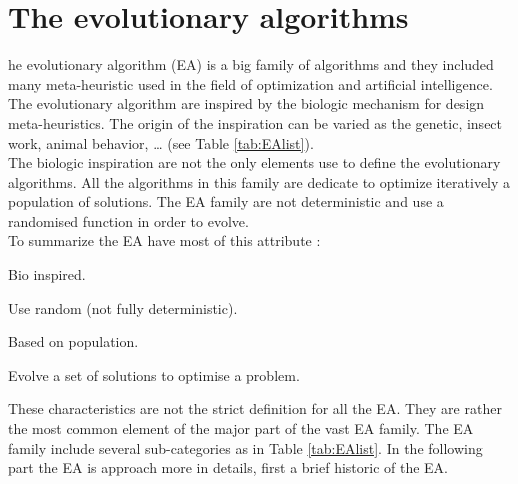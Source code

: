 \section{The evolutionary algorithms }
he evolutionary algorithm (EA) is a big family of algorithms and they included many meta-heuristic used in the field of optimization and artificial intelligence.\\
 The evolutionary algorithm are inspired by the biologic mechanism for design meta-heuristics. The origin of the inspiration can be varied as  the genetic, insect work, animal behavior, … (see Table  \ref{tab:EAlist}). \\
 The biologic inspiration are not the only elements use to define the evolutionary algorithms. All the algorithms in this family are dedicate to optimize iteratively a population of solutions. 
 The EA family are not deterministic and use a randomised function in order to evolve. \\
 To summarize the EA have most of this attribute : 
\begin{description}
\item Bio inspired. 
\item Use random (not fully deterministic).
\item Based on population. 
\item Evolve a set of solutions to optimise a problem.
\end{description}
These characteristics are not the strict definition for all the EA. They are rather the most common element of the major part of the vast EA family. The EA family include several  sub-categories as in Table \ref{tab:EAlist}. In the following  part the EA is approach more in details,  first a brief historic of the EA. 
 
